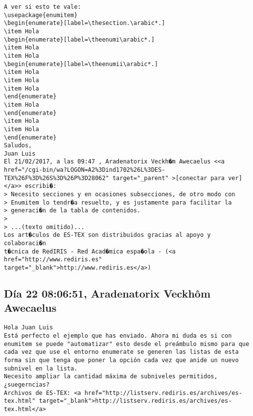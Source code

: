 \documentclass[a4paper,10pt]{article}
\begin{document}
\begin{lstlisting}
A ver si esto te vale:
\usepackage{enumitem}
\begin{enumerate}[label=\thesection.\arabic*.]
\item Hola
\begin{enumerate}[label=\theenumi\arabic*.]
\item Hola
\item Hola
\begin{enumerate}[label=\theenumii\arabic*.]
\item Hola
\item Hola
\item Hola
\end{enumerate}
\item Hola
\end{enumerate}
\item Hola
\item Hola
\end{enumerate}
Saludos,
Juan Luis
El 21/02/2017, a las 09:47 , Aradenatorix Veckh�m Awecaelus <<a href="/cgi-bin/wa?LOGON=A2%3Dind1702%26L%3DES-TEX%26F%3D%26S%3D%26P%3D28062" target="_parent" >[conectar para ver]</a>> escribi�:
> Necesito secciones y en ocasiones subsecciones, de otro modo con
> Enumitem lo tendr�a resuelto, y es justamente para facilitar la
> generaci�n de la tabla de contenidos.
> 
> ...(texto omitido)...
Los art�culos de ES-TEX son distribuidos gracias al apoyo y colaboraci�n 
t�cnica de RedIRIS - Red Acad�mica espa�ola - (<a href="http://www.rediris.es" target="_blank">http://www.rediris.es</a>)

\end{lstlisting}

\subsection{Día 22 08:06:51, Aradenatorix Veckhôm Awecaelus}

\begin{lstlisting}
Hola Juan Luis
Está perfecto el ejemplo que has enviado. Ahora mi duda es si con
enumitem se puede "automatizar" esto desde el preámbulo mismo para que
cada vez que use el entorno enumerate se generen las listas de esta
forma sin que tenga que poner la opción cada vez que anide un nuevo
subnivel en la lista.
Necesito ampliar la cantidad máxima de subniveles permitidos, ¿suegerncias?
Archivos de ES-TEX: <a href="http://listserv.rediris.es/archives/es-tex.html" target="_blank">http://listserv.rediris.es/archives/es-tex.html</a>

\end{lstlisting}
\end{document}
